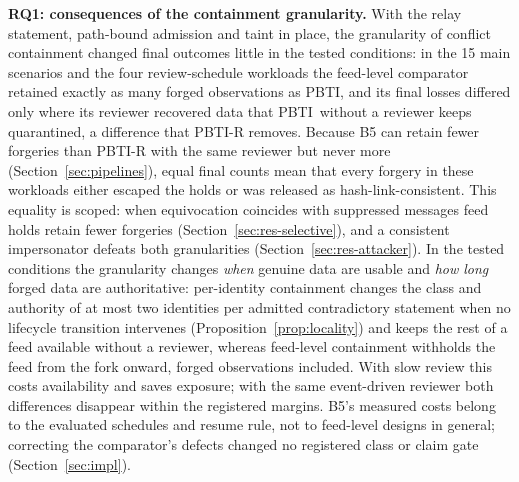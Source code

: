 \documentclass[futureinternet,article,submit,moreauthors]{Definitions/mdpi}
\newcommand{\sys}{PBTI}
\begin{document}
\textbf{RQ1: consequences of the containment granularity.} With the relay statement, path-bound admission and taint in place, the granularity of conflict containment changed final outcomes little in the tested conditions: in the 15 main scenarios and the four review-schedule workloads the feed-level comparator retained exactly as many forged observations as \sys, and its final losses differed only where its reviewer recovered data that \sys\ without a reviewer keeps quarantined, a difference that PBTI-R removes. Because B5 can retain fewer forgeries than PBTI-R with the same reviewer but never more (Section~\ref{sec:pipelines}), equal final counts mean that every forgery in these workloads either escaped the holds or was released as hash-link-consistent. This equality is scoped: when equivocation coincides with suppressed messages feed holds retain fewer forgeries (Section~\ref{sec:res-selective}), and a consistent impersonator defeats both granularities (Section~\ref{sec:res-attacker}). In the tested conditions the granularity changes \emph{when} genuine data are usable and \emph{how long} forged data are authoritative: per-identity containment changes the class and authority of at most two identities per admitted contradictory statement when no lifecycle transition intervenes (Proposition~\ref{prop:locality}) and keeps the rest of a feed available without a reviewer, whereas feed-level containment withholds the feed from the fork onward, forged observations included. With slow review this costs availability and saves exposure; with the same event-driven reviewer both differences disappear within the registered margins. B5's measured costs belong to the evaluated schedules and resume rule, not to feed-level designs in general; correcting the comparator's defects changed no registered class or claim gate (Section~\ref{sec:impl}).
\end{document}
